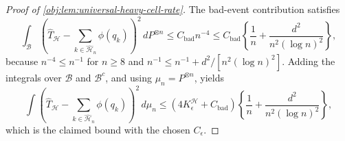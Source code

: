 \begin{proof}[Proof of \cref{obj:lem:universal-heavy-cell-rate}]
The bad-event contribution satisfies
\[
\int_{\mathcal B}
\left(
\widehat T_{\mathcal H}
-
\sum_{k\in\widehat{\mathcal H}_n}\phi(q_k)
\right)^2
\,dP^{\otimes n}
\le
C_{\mathrm{bad}} n^{-4}
\le
C_{\mathrm{bad}}
\left\{
\frac1n+\frac{d^2}{n^2(\log n)^2}
\right\},
\] %
because \(n^{-4}\le n^{-1}\) for \(n\ge8\) and \(n^{-1}\le n^{-1}+d^2/[n^2(\log n)^2]\). Adding the
integrals over \(\mathcal B\) and \(\mathcal B^c\), and using \(\mu_n=P^{\otimes n}\), yields
\[
\int
\left(
\widehat T_{\mathcal H}
-
\sum_{k\in\widehat{\mathcal H}_n}\phi(q_k)
\right)^2
\,d\mu_n
\le
(4K^{\mathcal H}_\epsilon+C_{\mathrm{bad}})
\left\{
\frac1n+\frac{d^2}{n^2(\log n)^2}
\right\},
\]
which is the claimed bound with the chosen \(C_\epsilon\). %
\end{proof}
